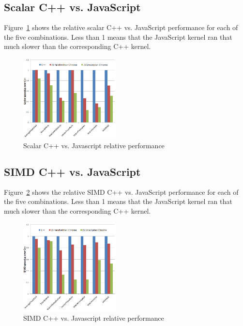 \documentclass[preprint]{sigplanconf}
\begin{document}
\subsection{Scalar C++ vs. JavaScript}

Figure~\ref{fig:cpp-js-scalar} shows the relative scalar C++ vs. JavaScript
performance for each of the five combinations. Less than 1 means that the 
JavaScript kernel ran that much slower than the corresponding C++ kernel.

\begin{figure}
\begin{center}
\includegraphics[width=0.45\textwidth]{figures/cpp-js-scalar.png}
\end{center}
\caption{Scalar C++ vs. Javascript relative performance}
\label{fig:cpp-js-scalar}
\end{figure}

\subsection{SIMD C++ vs. JavaScript}

Figure~\ref{fig:cpp-js-simd} shows the relative SIMD C++ vs. JavaScript
performance for each of the five combinations. Less than 1 means that the 
JavaScript kernel ran that much slower than the corresponding C++ kernel.

\begin{figure}
\begin{center}
\includegraphics[width=0.45\textwidth]{figures/cpp-js-simd.png}
\end{center}
\caption{SIMD C++ vs. Javascript relative performance}
\label{fig:cpp-js-simd}
\end{figure}
\end{document}

